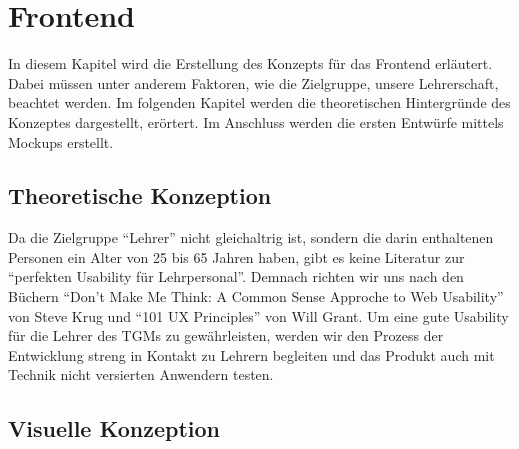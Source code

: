 \section{Frontend}
\label{chapter:konzept-frontend}
In diesem Kapitel wird die Erstellung des Konzepts für das Frontend erläutert. Dabei müssen unter anderem Faktoren, wie die Zielgruppe, unsere Lehrerschaft, beachtet werden. Im folgenden Kapitel werden die theoretischen Hintergründe des Konzeptes dargestellt, erörtert. Im Anschluss werden die ersten Entwürfe mittels Mockups erstellt. 
\subsection{Theoretische Konzeption}
\label{chapter:konzept-frontend-theorie}
Da die Zielgruppe \enquote{Lehrer} nicht gleichaltrig ist, sondern die darin enthaltenen Personen ein Alter von 25 bis 65 Jahren haben, gibt es keine Literatur zur \enquote{perfekten Usability für Lehrpersonal}. Demnach richten wir uns nach den Büchern \enquote{Don't Make Me Think: A Common Sense Approche to Web Usability} von Steve Krug und  \enquote{101 UX Principles} von Will Grant. Um eine gute Usability für die Lehrer des TGMs zu gewährleisten, werden wir den Prozess der Entwicklung streng in Kontakt zu Lehrern begleiten und das Produkt auch mit Technik nicht versierten Anwendern testen.  
\newpage
\subsection{Visuelle Konzeption}
\label{chapter:konzept-frontend-visuell}
